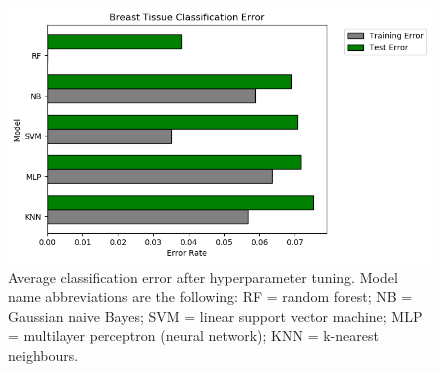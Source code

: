 \documentclass{article}
\begin{document}
\begin{figure}
	\centering
	\includegraphics[width=1\textwidth]{../figs/classification_error_1_10_trials}
	\caption{Average classification error after hyperparameter tuning. Model name abbreviations are the following: RF = random forest; NB = Gaussian naive Bayes; SVM = linear support vector machine; MLP = multilayer perceptron (neural network); KNN = k-nearest neighbours.}
	\label{fig:error}
\end{figure}
\end{document}
